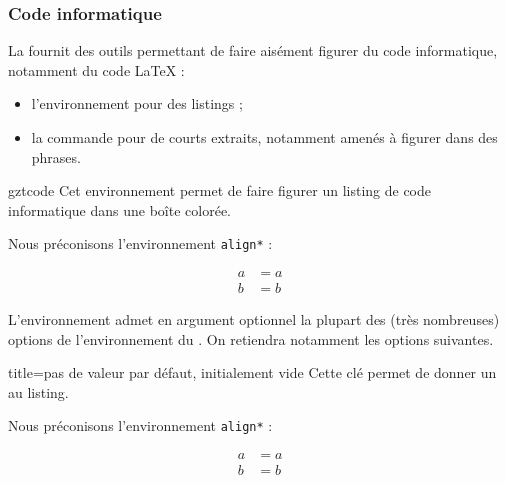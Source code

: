 \subsubsection{Code informatique}
\label{sec-commande-pour-code}

La \gztauthorcl{} fournit des outils permettant de faire aisément figurer du
code informatique, notamment du code \LaTeX{} :
\begin{itemize}
\item l'environnement  pour des listings ;
\item la commande  pour de courts extraits, notamment amenés
  à figurer dans des phrases.
\end{itemize}

\begin{docEnvironment}[doclang/environment content=listing]{gztcode}{}
  Cet environnement permet de faire figurer un listing de code informatique dans
  une boîte colorée.
\begin{bodycode}
Nous préconisons l'environnement \verb|align*| :
\begin{gztcode}
\begin{align*}
  a & = a\\
  b & = b
\end{align*}
\end{gztcode}
\end{bodycode}
\end{docEnvironment}

L'environnement  admet en argument optionnel la plupart des
(très nombreuses) options de l'environnement  du
. On retiendra notamment les options suivantes.

\begin{docKey}{title}{=}{pas de valeur par défaut,
    initialement vide}
  Cette clé permet de donner un  au listing.
\begin{bodycode}[listing and text,listing options={morekeywords={[2]title}}]
Nous préconisons l'environnement \verb|align*| :
\begin{gztcode}[title=Alignement d'équations]
\begin{align*}
  a & = a\\
  b & = b
\end{align*}
\end{gztcode}
\end{bodycode}
\end{docKey}

